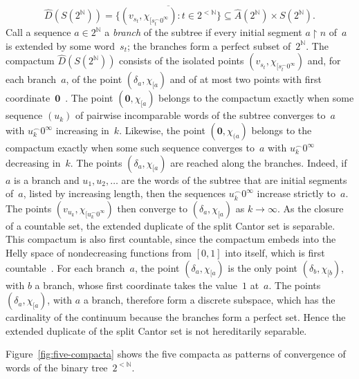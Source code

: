 \documentclass[psamsfonts]{amsart}
\theoremstyle{definition}
\theoremstyle{remark}
\newcommand{\restr}{{\restriction}}
\numberwithin{equation}{section}
\begin{document}
\begin{enumerate}
  \[
    \hat{D}(S(2^{\mathbb{N}}))=\overline{\{(v_{s_t},\chi_{[s_t^\frown0^\infty}):t\in2^{<\mathbb{N}}\}}\subseteq\hat{A}(2^{\mathbb{N}})\times S(2^{\mathbb{N}}).
  \]
  Call a sequence $a\in2^{\mathbb{N}}$ a \emph{branch} of the subtree if every initial segment $a\restr n$ of~$a$ is extended by some word~$s_t$;
  the branches form a perfect subset of~$2^{\mathbb{N}}$.
  The compactum $\hat{D}(S(2^{\mathbb{N}}))$ consists of the isolated points $(v_{s_t},\chi_{[s_t^\frown0^\infty})$ and, for each branch~$a$, of the point $(\delta_a,\chi_{[a})$ and of at most two points with first coordinate~$\mathbf{0}$~\cite[4.3.7]{argyros2008rosenthal}.
  The point $(\mathbf{0},\chi_{[a})$ belongs to the compactum exactly when some sequence $(u_k)$ of pairwise incomparable words of the subtree converges to~$a$ with $u_k^\frown0^\infty$ increasing in~$k$.
  Likewise, the point $(\mathbf{0},\chi_{(a})$ belongs to the compactum exactly when some such sequence converges to~$a$ with $u_k^\frown0^\infty$ decreasing in~$k$.
  The points $(\delta_a,\chi_{[a})$ are reached along the branches.
  Indeed, if $a$ is a branch and $u_1,u_2,\dots$ are the words of the subtree that are initial segments of~$a$, listed by increasing length, then the sequences $u_k^\frown0^\infty$ increase strictly to~$a$.
  The points $(v_{u_k},\chi_{[u_k^\frown0^\infty})$ then converge to $(\delta_a,\chi_{[a})$ as $k\to\infty$.
  As the closure of a countable set, the extended duplicate of the split Cantor set is separable.
  This compactum is also first countable, since the compactum embeds into the Helly space of nondecreasing functions from $[0,1]$ into itself, which is first countable~\cite[4.3.7]{argyros2008rosenthal}.
  For each branch~$a$, the point $(\delta_a,\chi_{[a})$ is the only point $(\delta_b,\chi_{[b})$, with $b$ a branch, whose first coordinate takes the value~$1$ at~$a$.
  The points $(\delta_a,\chi_{[a})$, with $a$ a branch, therefore form a discrete subspace, which has the cardinality of the continuum because the branches form a perfect set.
  Hence the extended duplicate of the split Cantor set is not hereditarily separable.
\end{enumerate}

Figure~\ref{fig:five-compacta} shows the five compacta as patterns of convergence of words of the binary tree~$2^{<\mathbb{N}}$.
\end{document}
